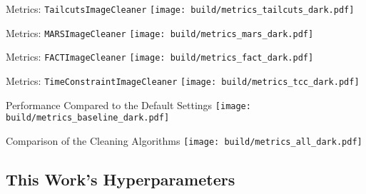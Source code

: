 \begin{frame}{Metrics: \texttt{TailcutsImageCleaner}}
    \centering
    \texttt{[image: build/metrics\_tailcuts\_dark.pdf]}
\end{frame}

\begin{frame}{Metrics: \texttt{MARSImageCleaner}}
    \centering
    \texttt{[image: build/metrics\_mars\_dark.pdf]}
\end{frame}

\begin{frame}{Metrics: \texttt{FACTImageCleaner}}
    \vspace{-0.355cm}
    \centering
    \texttt{[image: build/metrics\_fact\_dark.pdf]}
\end{frame}

\begin{frame}{Metrics: \texttt{TimeConstraintImageCleaner}}
    \vspace{-0.15cm}
    \centering
    \texttt{[image: build/metrics\_tcc\_dark.pdf]}
\end{frame}

\begin{frame}[label=metrics_baseline]{Performance Compared to the Default Settings}
    \centering
    \texttt{[image: build/metrics\_baseline\_dark.pdf]}
\end{frame}

\begin{frame}{Comparison of the Cleaning Algorithms}
    \centering
    \texttt{[image: build/metrics\_all\_dark.pdf]}
\end{frame}

\subsection{This Work's Hyperparameters}%
\label{sub:Hyperparameters_thesis}

